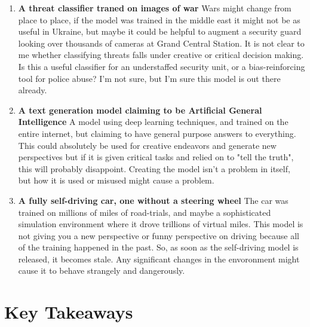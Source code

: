 \begin{enumerate}
    \item \textbf{A threat classifier traned on images of war} Wars might change from place to place, if the model was trained in the middle east it might not be as useful in Ukraine, but maybe it could be helpful to augment a security guard looking over thousands of cameras at Grand Central Station. It is not clear to me whether classifying threats falls under creative or critical decision making. Is this a useful classifier for an understaffed security unit, or a bias-reinforcing tool for police abuse? I'm not sure, but I'm sure this model is out there already.
    \item \textbf{A text generation model claiming to be Artificial General Intelligence} A model using deep learning techniques, and trained on the entire internet, but claiming to have general purpose answers to everything. This could absolutely be used for creative endeavors and generate new perspectives but if it is given critical tasks and relied on to "tell the truth", this will probably disappoint. Creating the model isn't a problem in itself, but how it is used or misused might cause a problem.
    \item \textbf{A fully self-driving car, one without a steering wheel} The car was trained on millions of miles of road-trials, and maybe a sophisticated simulation environment where it drove trillions of virtual miles. This model is not giving you a new perspective or funny perspective on driving because all of the training happened in the past. So, as soon as the self-driving model is released, it becomes stale. Any significant changes in the envoronment might cause it to behave strangely and dangerously.
\end{enumerate}


\section{Key Takeaways}


